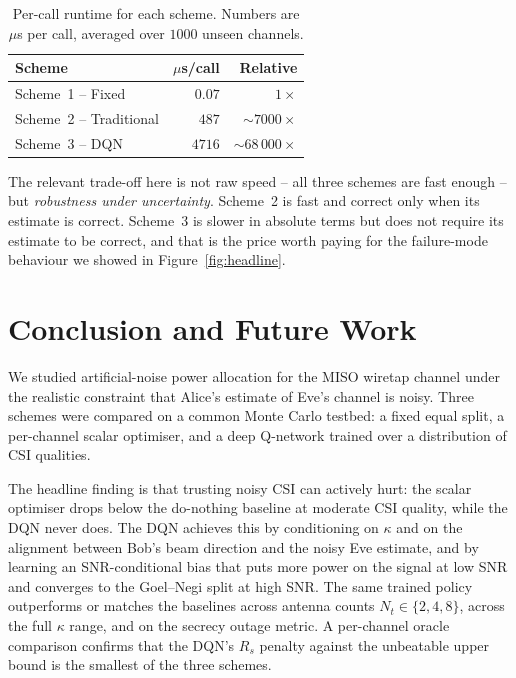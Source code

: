 \documentclass[conference]{IEEEtran}
\begin{document}
\begin{table}[h]
\centering
\caption{Per-call runtime for each scheme. Numbers are
$\mu$s per call, averaged over $1000$ unseen channels.}
\label{tab:runtime}
\begin{tabular}{@{}lrr@{}}
\toprule
\textbf{Scheme} & \textbf{$\mu$s/call} & \textbf{Relative} \\
\midrule
Scheme~1 -- Fixed       & $0.07$    & $1\times$ \\
Scheme~2 -- Traditional & $487$     & $\sim 7000\times$ \\
Scheme~3 -- DQN         & $4716$    & $\sim 68\,000\times$ \\
\bottomrule
\end{tabular}
\end{table}

The relevant trade-off here is not raw speed -- all three schemes are
fast enough -- but \emph{robustness under uncertainty}. Scheme~2 is
fast and correct only when its estimate is correct. Scheme~3 is
slower in absolute terms but does not require its estimate to be
correct, and that is the price worth paying for the failure-mode
behaviour we showed in Figure~\ref{fig:headline}.

\section{Conclusion and Future Work}\label{sec:conclusion}

We studied artificial-noise power allocation for the MISO wiretap
channel under the realistic constraint that Alice's estimate of Eve's
channel is noisy. Three schemes were compared on a common Monte Carlo
testbed: a fixed equal split, a per-channel scalar optimiser, and a
deep Q-network trained over a distribution of CSI qualities.

The headline finding is that trusting noisy CSI can actively hurt: the
scalar optimiser drops below the do-nothing baseline at moderate CSI
quality, while the DQN never does. The DQN achieves this by
conditioning on $\kappa$ and on the alignment between Bob's beam
direction and the noisy Eve estimate, and by learning an SNR-conditional
bias that puts more power on the signal at low SNR and converges to the
Goel--Negi split at high SNR. The same trained policy outperforms or
matches the baselines across antenna counts $N_t \in \{2, 4, 8\}$,
across the full $\kappa$ range, and on the secrecy outage metric. A
per-channel oracle comparison confirms that the DQN's $R_s$ penalty
against the unbeatable upper bound is the smallest of the three
schemes.
\end{document}
